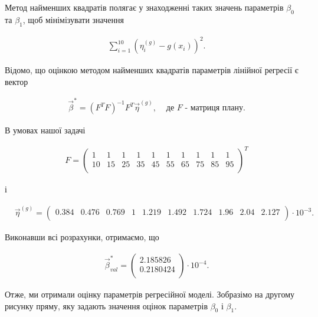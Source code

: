 \documentclass[14pt,a4paper]{scrartcl}
\theoremstyle{definition}
\theoremstyle{remark}
\theoremstyle{definition}
\theoremstyle{definition}
\begin{document}
Метод найменших квадратів полягає у знаходженні таких значень параметрів $\beta_{0}$ та $\beta_{1}$, щоб мінімізувати значення

\begin{align*}
  & \sum_{i = 1}^{10} (\eta^{(g)}_{i} - g(x_{i}))^2.
\end{align*}

Відомо, що оцінкою методом найменших квадратів параметрів лінійної регресії є вектор

\begin{align*}
  & \vec{\beta}^{*} = (F^{T}F)^{-1}F^{T}\vec{\eta}^{(g)}, &\text{  де  } F \text{ - матриця плану.}
\end{align*}

В умовах нашої задачі

\begin{align*}
  & F = \begin{pmatrix}
    1 & 1 & 1 & 1 & 1 & 1 & 1 & 1 & 1 & 1 \\
    10 & 15 & 25 & 35 & 45 & 55 & 65 & 75 & 85 & 95  \\
  \end{pmatrix}^{T}
\end{align*}

і

\begin{align*}
  & \vec{\eta}^{(g)} =\begin{pmatrix}
    0.384 & 0.476 & 0.769 & 1 & 1.219 & 1.492 & 1.724 & 1.96 & 2.04 & 2.127 \\
  \end{pmatrix} \cdot 10^{-3}.
\end{align*}

Виконавши всі розрахунки, отримаємо, що

\begin{align*}
  & \vec{\beta}^{*}_ {val} = \begin{pmatrix}
    2.185826  \\
    0.2180424  \\
  \end{pmatrix} \cdot 10^{-4}.
\end{align*}

Отже, ми отримали оцінку параметрів регресійної моделі. Зобразімо на другому рисунку пряму, яку задають значення оцінок параметрів $\beta_{0}$ і $\beta_{1}$.
\end{document}
